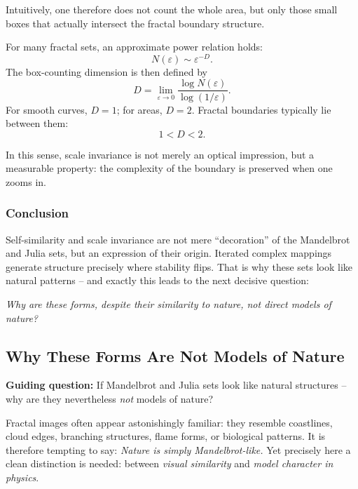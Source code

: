 Intuitively, one therefore does not count the whole area,
but only those small boxes
that actually intersect the fractal boundary structure.

\begin{MathBox}
	\label{box:boxcounting}
	\small
	For many fractal sets, an approximate power relation holds:
	\[
	N(\varepsilon)\sim \varepsilon^{-D}.
	\]
	The box-counting dimension is then defined by
	\[
	D=\lim_{\varepsilon\to 0}\frac{\log N(\varepsilon)}{\log(1/\varepsilon)}.
	\]
	For smooth curves, \(D=1\);
	for areas, \(D=2\).
	Fractal boundaries typically lie between them:
	\[
	1<D<2.
	\]
\end{MathBox}

In this sense, scale invariance is not merely an optical impression,
but a measurable property:
the complexity of the boundary is preserved when one zooms in.

\subsubsection*{Conclusion}

Self-similarity and scale invariance are not mere ``decoration''
of the Mandelbrot and Julia sets,
but an expression of their origin.
Iterated complex mappings generate structure precisely where
stability flips.
That is why these sets look like natural patterns --
and exactly this leads to the next decisive question:

\medskip
\noindent\emph{Why are these forms, despite their similarity to nature, not direct models of nature?}


\subsection{Why These Forms Are Not Models of Nature}

\textbf{Guiding question:} If Mandelbrot and Julia sets look like natural structures -- why are they nevertheless \emph{not} models of nature?

Fractal images often appear astonishingly familiar:
they resemble coastlines, cloud edges, branching structures, flame forms, or biological patterns.
It is therefore tempting to say:
\emph{Nature is simply Mandelbrot-like.}
Yet precisely here a clean distinction is needed:
between \emph{visual similarity} and \emph{model character in physics}.

